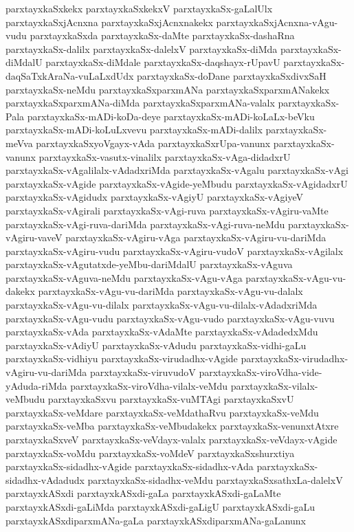 {parxtayxkaSxkekx
parxtayxkaSxkekxV
parxtayxkaSx-gaLalUlx
parxtayxkaSxjAcnxna
parxtayxkaSxjAcnxnakekx
parxtayxkaSxjAcnxna-vAgu-vudu
parxtayxkaSxda
parxtayxkaSx-daMte
parxtayxkaSx-dashaRna
parxtayxkaSx-dalilx
parxtayxkaSx-dalelxV
parxtayxkaSx-diMda
parxtayxkaSx-diMdalU
parxtayxkaSx-diMdale
parxtayxkaSx-daqshayx-rUpavU
parxtayxkaSx-daqSaTxkAraNa-vuLaLxdUdx
parxtayxkaSx-doDane
parxtayxkaSxdivxSaH
parxtayxkaSx-neMdu
parxtayxkaSxparxmANa
parxtayxkaSxparxmANakekx
parxtayxkaSxparxmANa-diMda
parxtayxkaSxparxmANa-valalx
parxtayxkaSx-Pala
parxtayxkaSx-mADi-koDa-deye
parxtayxkaSx-mADi-koLaLx-beVku
parxtayxkaSx-mADi-koLuLxvevu
parxtayxkaSx-mADi-dalilx
parxtayxkaSx-meVva
parxtayxkaSxyoVgayx-vAda
parxtayxkaSxrUpa-vanunx
parxtayxkaSx-vanunx
parxtayxkaSx-vasutx-vinalilx
parxtayxkaSx-vAga-didadxrU
parxtayxkaSx-vAgalilalx-vAdadxriMda
parxtayxkaSx-vAgalu
parxtayxkaSx-vAgi
parxtayxkaSx-vAgide
parxtayxkaSx-vAgide-yeMbudu
parxtayxkaSx-vAgidadxrU
parxtayxkaSx-vAgidudx
parxtayxkaSx-vAgiyU
parxtayxkaSx-vAgiyeV
parxtayxkaSx-vAgirali
parxtayxkaSx-vAgi-ruva
parxtayxkaSx-vAgiru-vaMte
parxtayxkaSx-vAgi-ruva-dariMda
parxtayxkaSx-vAgi-ruva-neMdu
parxtayxkaSx-vAgiru-vaveV
parxtayxkaSx-vAgiru-vAga
parxtayxkaSx-vAgiru-vu-dariMda
parxtayxkaSx-vAgiru-vudu
parxtayxkaSx-vAgiru-vudoV
parxtayxkaSx-vAgilalx
parxtayxkaSx-vAgutatxde-yeMbu-dariMdalU
parxtayxkaSx-vAguva
parxtayxkaSx-vAguva-neMdu
parxtayxkaSx-vAgu-vAga
parxtayxkaSx-vAgu-vu-dakekx
parxtayxkaSx-vAgu-vu-dariMda
parxtayxkaSx-vAgu-vu-dalalx
parxtayxkaSx-vAgu-vu-dilalx
parxtayxkaSx-vAgu-vu-dilalx-vAdadxriMda
parxtayxkaSx-vAgu-vudu
parxtayxkaSx-vAgu-vudo
parxtayxkaSx-vAgu-vuvu
parxtayxkaSx-vAda
parxtayxkaSx-vAdaMte
parxtayxkaSx-vAdadedxMdu
parxtayxkaSx-vAdiyU
parxtayxkaSx-vAdudu
parxtayxkaSx-vidhi-gaLu
parxtayxkaSx-vidhiyu
parxtayxkaSx-virudadhx-vAgide
parxtayxkaSx-virudadhx-vAgiru-vu-dariMda
parxtayxkaSx-viruvudoV
parxtayxkaSx-viroVdha-vide-yAduda-riMda
parxtayxkaSx-viroVdha-vilalx-veMdu
parxtayxkaSx-vilalx-veMbudu
parxtayxkaSxvu
parxtayxkaSx-vuMTAgi
parxtayxkaSxvU
parxtayxkaSx-veMdare
parxtayxkaSx-veMdathaRvu
parxtayxkaSx-veMdu
parxtayxkaSx-veMba
parxtayxkaSx-veMbudakekx
parxtayxkaSx-venunxtAtxre
parxtayxkaSxveV
parxtayxkaSx-veVdayx-valalx
parxtayxkaSx-veVdayx-vAgide
parxtayxkaSx-voMdu
parxtayxkaSx-voMdeV
parxtayxkaSxshurxtiya
parxtayxkaSx-sidadhx-vAgide
parxtayxkaSx-sidadhx-vAda
parxtayxkaSx-sidadhx-vAdadudx
parxtayxkaSx-sidadhx-veMdu
parxtayxkaSxsathxLa-dalelxV
parxtayxkASxdi
parxtayxkASxdi-gaLa
parxtayxkASxdi-gaLaMte
parxtayxkASxdi-gaLiMda
parxtayxkASxdi-gaLigU
parxtayxkASxdi-gaLu
parxtayxkASxdiparxmANa-gaLa
parxtayxkASxdiparxmANa-gaLanunx
}
